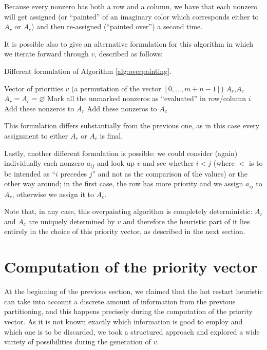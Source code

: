 Because every nonzero has both a row and a column, we have that each nonzero will get assigned (or ``painted'' of an imaginary color which corresponds either to $A_r$ or $A_c$) and then re-assigned (``painted over'') a second time.

It is possible also to give an alternative formulation for this algorithm in which we iterate forward through $v$, described as follows:

\begin{algorithm}[H]
\caption{Different formulation of Algorithm \ref{alg:overpainting}.} \label{alg:overpainting-2}
\begin{algorithmic}
\STATE
\REQUIRE Vector of priorities $v$ (a permutation of the vector $[0,\dots,m+n-1]$)
\ENSURE $A_r$,$A_c$
\STATE 
\STATE $A_r = A_c = \varnothing$
\STATE Mark all the unmarked nonzeros as ``evaluated'' in row/column $i$
\STATE Add these nonzeros to $A_r$
\ELSE
\STATE Add these nonzeros to $A_c$
\ENDIF
\ENDFOR
\end{algorithmic}
\end{algorithm}

This formulation differs substantially from the previous one, as in this case every assignment to either $A_r$ or $A_c$ is final.

Lastly, another different formulation is possible:  we could consider (again) individually each nonzero $a_{ij}$ and look up $v$ and see whether $i < j$ (where $<$ is to be intended as ``$i$ precedes $j$'' and not as the comparison of the values) or the other way around; in the first case, the row has more priority and we assign $a_{ij}$ to $A_r$, otherwise we assign it to $A_c$.

Note that, in any case, this overpainting algorithm is completely deterministic: $A_r$ and $A_c$ are uniquely determined by $v$ and therefore the heuristic part of it lies entirely in the choice of this priority vector, as described in the next section.

\section{Computation of the priority vector}

At the beginning of the previous section, we claimed that the hot restart heuristic can take into account a discrete amount of information from the previous partitioning, and this happens precisely during the computation of the priority vector. As it is not known exactly which information is good to employ and which one is to be discarded, we took a structured approach and explored a wide variety of possibilities during the generation of $v$.

